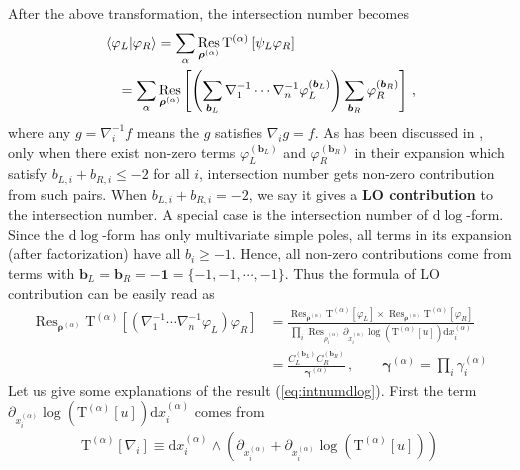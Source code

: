 \documentclass[a4paper,11pt]{article}
\newcommand{\nn}{\nonumber}
\newcommand{\nd}{\mathrm{d}}
\newcommand{\nT}{\mathrm{T}}
\def\eref#1{(\ref{#1})}
\DeclareMathOperator{\Res}{Res}
\begin{document}
After the above transformation, the intersection number becomes
\begin{align}
&\braket{\varphi_L|\varphi_R}     = \sum_{\alpha} \Res_{\bm{\rho}^{(\alpha)}} \nT^{(\alpha)}\left[ \psi_L \varphi_R\right] \nn\\
&\quad = \sum_{\alpha} \Res_{\bm{\rho}^{(\alpha)}} \left[ \left( \sum_{\bm{b}_L}  \nabla_1^{-1} \cdots \nabla_n^{-1} \varphi^{(\bm{b}_L)}_L  \right) \sum_{\bm{b}_R}\varphi^{(\bm{b}_R)}_R  \right] \,, \label{eq:intnumexpand}
\end{align}
where any $g=\nabla_i^{-1}  f$ means the $g$ satisfies $\nabla_i g = f$.
As has been discussed in \cite{Chen:2023kgw}, only when there exist non-zero terms $\varphi^{(\bm{b}_L)}_L$ and $\varphi^{(\bm{b}_R)}_R$ in their expansion which satisfy $b_{L,i}+b_{R,i} \leq -2$ for all $i$, intersection number gets non-zero contribution from such pairs. When $b_{L,i}+b_{R,i} = -2$, we say it gives a {\bf LO contribution} to the intersection number. 
A special case  is the intersection number of $\nd \log$-form. Since the $\nd \log$-form has only multivariate simple poles, all terms in its expansion (after factorization) have all $b_i\geq -1$. Hence, all non-zero contributions come from terms with $\bm{b}_L=\bm{b}_R=\bm{-1}=\{-1,-1,\cdots,-1\}$. Thus the formula of LO contribution can be easily read  as 
\begin{align}
\Res_{\bm{\rho}^{(\alpha)}} \nT^{(\alpha)}\left[  \left( \nabla_1^{-1} \cdots \nabla_n^{-1}  \varphi_L \right)  \varphi_R \right] &= \frac{\Res_{\bm{\rho}^{(\alpha)}} \nT^{(\alpha)}\left[\varphi_L \right]  \times  \Res_{\bm{\rho}^{(\alpha)}} \nT^{(\alpha)}\left[\varphi_R \right]  }{ \prod_{i} \Res_{\rho^{(\alpha)}_i} \partial_{x_i^{(\alpha)}} \log\left(\nT^{(\alpha)}\left[u \right] \right) \nd x_i^{(\alpha)} } \nn\\
& =  \frac{C_L^{(\bm{b}_L)} C_R^{(\bm{b}_R)}}{\bm{\gamma}^{(\alpha)}} \, , \quad \quad \bm{\gamma}^{(\alpha)}= \prod_i \gamma_i^{(\alpha)} \label{eq:intnumdlog}
\end{align}
Let us give some explanations of the result \eref{eq:intnumdlog}. First the term 
$
\partial_{x_i^{(\alpha)}} \log\left(\nT^{(\alpha)}\left[u \right] \right) \nd x_i^{(\alpha)} $%
comes from 
\begin{align}
\nT^{(\alpha)}[ \nabla_i] \equiv \nd x_i^{(\alpha)} \wedge \left(\partial_{x_i^{(\alpha)}} +  \partial_{x_i^{(\alpha)}} \log\left(\nT^{(\alpha)}\left[u \right]\right)  \right)
\end{align}
\end{document}
